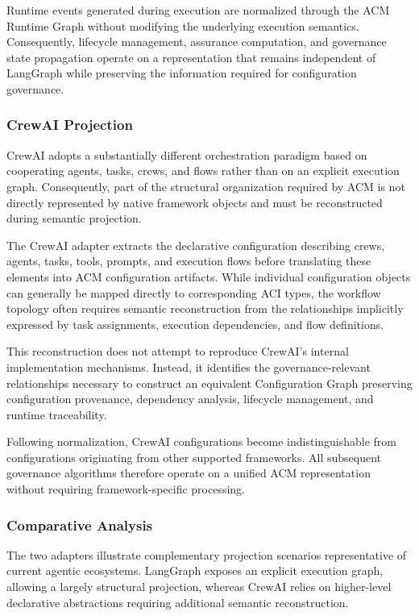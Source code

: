 \documentclass[10pt]{article}
\begin{document}
Runtime events generated during execution are normalized through the ACM Runtime Graph without modifying the underlying execution semantics. Consequently, lifecycle management, assurance computation, and governance state propagation operate on a representation that remains independent of LangGraph while preserving the information required for configuration governance.


\subsubsection{CrewAI Projection}

CrewAI adopts a substantially different orchestration paradigm based on cooperating agents, tasks, crews, and flows rather than on an explicit execution graph. Consequently, part of the structural organization required by ACM is not directly represented by native framework objects and must be reconstructed during semantic projection.

The CrewAI adapter extracts the declarative configuration describing crews, agents, tasks, tools, prompts, and execution flows before translating these elements into ACM configuration artifacts. While individual configuration objects can generally be mapped directly to corresponding ACI types, the workflow topology often requires semantic reconstruction from the relationships implicitly expressed by task assignments, execution dependencies, and flow definitions.

This reconstruction does not attempt to reproduce CrewAI's internal implementation mechanisms. Instead, it identifies the governance-relevant relationships necessary to construct an equivalent Configuration Graph preserving configuration provenance, dependency analysis, lifecycle management, and runtime traceability.

Following normalization, CrewAI configurations become indistinguishable from configurations originating from other supported frameworks. All subsequent governance algorithms therefore operate on a unified ACM representation without requiring framework-specific processing.



\subsubsection{Comparative Analysis}

The two adapters illustrate complementary projection scenarios representative of current agentic ecosystems. LangGraph exposes an explicit execution graph, allowing a largely structural projection, whereas CrewAI relies on higher-level declarative abstractions requiring additional semantic reconstruction.
\end{document}
